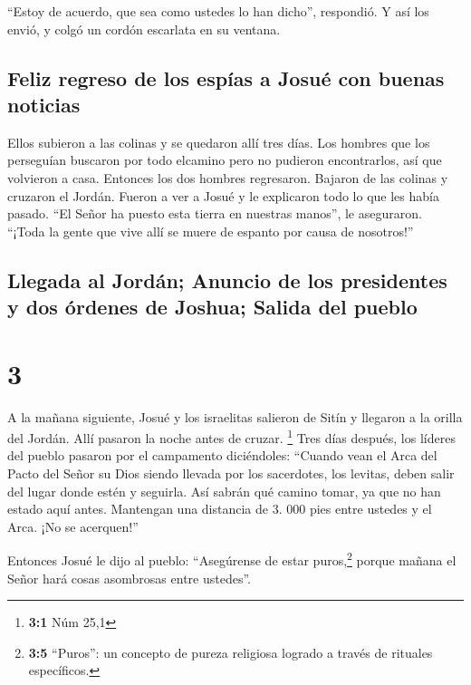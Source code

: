  ``Estoy de acuerdo, que sea como ustedes lo han dicho'',
respondió. Y así los envió, y colgó un cordón escarlata en su ventana.

\hypertarget{feliz-regreso-de-los-espuxedas-a-josuuxe9-con-buenas-noticias}{%
\subsection{Feliz regreso de los espías a Josué con buenas
noticias}\label{feliz-regreso-de-los-espuxedas-a-josuuxe9-con-buenas-noticias}}

 Ellos subieron a las colinas y se quedaron allí tres
días. Los hombres que los perseguían buscaron por todo elcamino pero no
pudieron encontrarlos, así que volvieron a casa. 
Entonces los dos hombres regresaron. Bajaron de las colinas y cruzaron
el Jordán. Fueron a ver a Josué y le explicaron todo lo que les había
pasado.  ``El Señor ha puesto esta tierra en nuestras
manos'', le aseguraron. ``¡Toda la gente que vive allí se muere de
espanto por causa de nosotros!''

\hypertarget{llegada-al-jorduxe1n-anuncio-de-los-presidentes-y-dos-uxf3rdenes-de-joshua-salida-del-pueblo}{%
\subsection{Llegada al Jordán; Anuncio de los presidentes y dos órdenes
de Joshua; Salida del
pueblo}\label{llegada-al-jorduxe1n-anuncio-de-los-presidentes-y-dos-uxf3rdenes-de-joshua-salida-del-pueblo}}

\hypertarget{section-2}{%
\section{3}\label{section-2}}

 A la mañana siguiente, Josué y los israelitas salieron de
Sitín y llegaron a la orilla del Jordán. Allí pasaron la noche antes de
cruzar. \footnote{\textbf{3:1} Núm 25,1}  Tres días
después, los líderes del pueblo pasaron por el campamento 
diciéndoles: ``Cuando vean el Arca del Pacto del Señor su Dios siendo
llevada por los sacerdotes, los levitas, deben salir del lugar donde
estén y seguirla.  Así sabrán qué camino tomar, ya que no
han estado aquí antes. Mantengan una distancia de 3. 000 pies entre
ustedes y el Arca. ¡No se acerquen!''

 Entonces Josué le dijo al pueblo: ``Asegúrense de estar
puros,\footnote{\textbf{3:5} ``Puros'': un concepto de pureza religiosa
  logrado a través de rituales específicos.} porque mañana el Señor hará
cosas asombrosas entre ustedes''.

